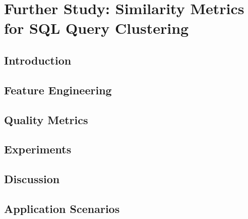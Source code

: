\chapter{Further Study: Similarity Metrics for SQL Query Clustering}
\label{chapter:similaritymetrics}

\section{Introduction}
\label{sec:introduction}



%

\section{Feature Engineering}
\label{sec:system}


\section{Quality Metrics}
\label{sec:dcabench}


\section{Experiments}
\label{sec:experiment}


\section{Discussion}
\label{sec:discussion}


\section{Application Scenarios}
\label{sec:scenarios}


%